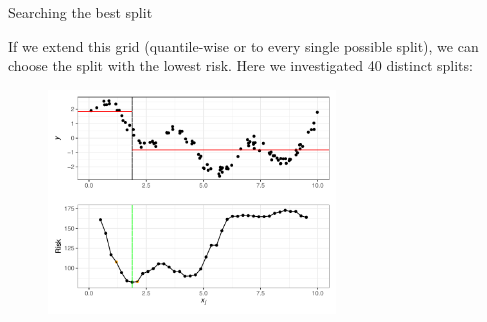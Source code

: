\documentclass[11pt,compress,t,notes=noshow, xcolor=table]{beamer}
\begin{document}
\begin{vbframe}{Searching the best split}

If we extend this grid (quantile-wise or to every single possible split), we can choose the split with the lowest risk. 
Here we investigated 40 distinct splits:

\begin{figure}
\includegraphics[width=0.68\textwidth]{figure/splitcrit_optimal-constant-grid2.pdf} 
\end{figure}


\end{vbframe}
\end{document}
